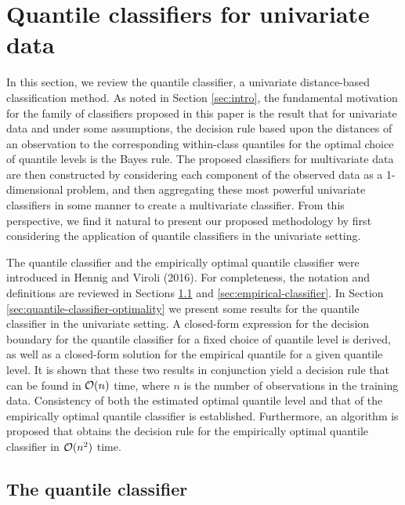 
\section{Quantile classifiers for univariate data}
\label{sec:univariate-classifier}

In this section, we review the quantile classifier, a univariate distance-based
classification method.  As noted in Section \ref{sec:intro}, the fundamental
motivation for the family of classifiers proposed in this paper is the result
that for univariate data and under some assumptions, the decision rule based
upon the distances of an observation to the corresponding within-class quantiles
for the optimal choice of quantile levels is the Bayes rule.  The proposed
classifiers for multivariate data are then constructed by considering each
component of the observed data as a 1-dimensional problem, and then aggregating
these most powerful univariate classifiers in some manner to create a
multivariate classifier.  From this perspective, we find it natural to present
our proposed methodology by first considering the application of quantile
classifiers in the univariate setting.

The quantile classifier and the empirically optimal quantile classifier were
introduced in Hennig and Viroli (2016).  For completeness, the notation and
definitions are reviewed in Sections \ref{sec:quantile-classifier} and
\ref{sec:empirical-classifier}.  In Section
\ref{sec:quantile-classifier-optimality} we present some results for the
quantile classifier in the univariate setting.  A closed-form expression for the
decision boundary for the quantile classifier for a fixed choice of quantile
level is derived, as well as a closed-form solution for the empirical quantile
for a given quantile level.  It is shown that these two results in conjunction
yield a decision rule that can be found in $\mathcal{O}(n)$ time, where $n$ is the
number of observations in the training data.  Consistency of both the estimated
optimal quantile level and that of the empirically optimal quantile classifier
is established.  Furthermore, an algorithm is proposed that obtains the decision
rule for the empirically optimal quantile classifier in $\mathcal{O}(n^2)$ time.




\subsection{The quantile classifier}
\label{sec:quantile-classifier}

